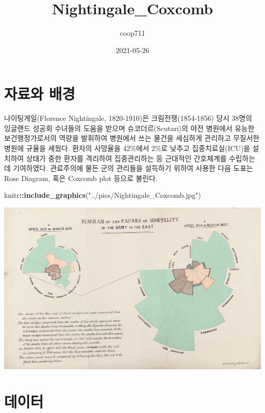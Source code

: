 \documentclass[
]{article}
\title{Nightingale\_Coxcomb}
\author{coop711}
\date{2021-05-26}
\newenvironment{Shaded}{\begin{snugshade}}{\end{snugshade}}
\newcommand{\KeywordTok}[1]{\textcolor[rgb]{0.13,0.29,0.53}{\textbf{#1}}}
\newcommand{\NormalTok}[1]{#1}
\newcommand{\OperatorTok}[1]{\textcolor[rgb]{0.81,0.36,0.00}{\textbf{#1}}}
\newcommand{\StringTok}[1]{\textcolor[rgb]{0.31,0.60,0.02}{#1}}
\begin{document}
\maketitle

\hypertarget{uxc790uxb8ccuxc640-uxbc30uxacbd}{%
\section{자료와 배경}\label{uxc790uxb8ccuxc640-uxbc30uxacbd}}

나이팅게일(Florence Nightingale, 1820-1910)은 크림전쟁(1854-1856) 당시
38명의 잉글랜드 성공회 수녀들의 도움을 받으며 슈코더르(Scutari)의 야전
병원에서 유능한 보건행정가로서의 역량을 발휘하여 병원에서 쓰는 물건을
세심하게 관리하고 무질서한 병원에 규율을 세웠다. 환자의 사망율을
42\%에서 2\%로 낮추고 집중치료실(ICU)을 설치하여 상태가 중한 환자를
격리하여 집중관리하는 등 근대적인 간호체계를 수립하는 데 기여하였다.
관료주의에 물든 군의 관리들을 설득하기 위하여 사용한 다음 도표는 Rose
Diagram, 혹은 Coxcomb plot 등으로 불린다.

\begin{Shaded}
\begin{Highlighting}[]
\NormalTok{knitr}\OperatorTok{::}\KeywordTok{include_graphics}\NormalTok{(}\StringTok{"../pics/Nightingale_Coxcomb.jpg"}\NormalTok{)}
\end{Highlighting}
\end{Shaded}

\includegraphics[width=1\linewidth]{../pics/Nightingale_Coxcomb}

\hypertarget{uxb370uxc774uxd130}{%
\section{데이터}\label{uxb370uxc774uxd130}}
\end{document}
